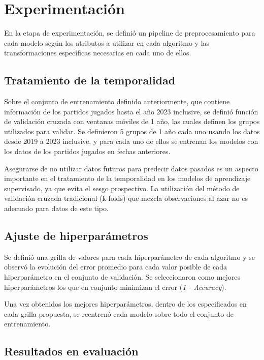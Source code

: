 \documentclass[conference]{IEEEtran}
\begin{document}
\section{Experimentación}

En la etapa de experimentación, se definió un pipeline de preprocesamiento para cada modelo según los atributos a utilizar en cada algoritmo y las transformaciones específicas necesarias en cada uno de ellos.

\subsection{Tratamiento de la temporalidad}

Sobre el conjunto de entrenamiento definido anteriormente, que contiene información de los partidos jugados hasta el año 2023 inclusive,  se definió función de validación cruzada con ventanas móviles de 1 año, las cuales definen los grupos utilizados para validar. Se definieron 5 grupos de 1 año cada uno usando los datos desde 2019 a 2023 inclusive, y para cada uno de ellos se entrenan los modelos con los datos de los partidos jugados en fechas anteriores. 

Asegurarse de no utilizar datos futuros para predecir datos pasados es un aspecto importante en el tratamiento de la temporalidad en los modelos de aprendizaje supervisado, ya que evita el sesgo prospectivo. La utilización del método de validación cruzada tradicional (k-folds) que mezcla observaciones al azar no es adecuado para datos de este tipo.

\subsection{Ajuste de hiperparámetros}

Se definió una grilla de valores para cada hiperparámetro de cada algoritmo y se observó la evolución del error promedio para cada valor posible de cada hiperparámetro en el conjunto de validación. Se seleccionaron como mejores hiperparámetros los que en conjunto minimizan el error (\textit{1 - Accuracy}).

Una vez obtenidos los mejores hiperparámetros, dentro de los especificados en cada grilla propuesta, se reentrenó cada modelo sobre todo el conjunto de entrenamiento.

\subsection{Resultados en evaluación}
\end{document}
